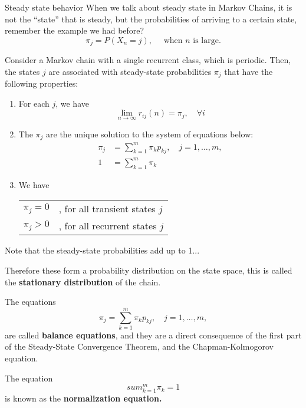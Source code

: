 \documentclass[aspectratio=169]{beamer}
\begin{document}
\begin{frame}{Steady state behavior}
    When we talk about steady state in Markov Chains, it is not the ``state'' that is steady,
    but the probabilities of arriving to a certain state, remember the example we had before?
    \[\pi_j=P(X_n=j),\quad \text{ when } n \text{ is large.}\]
\end{frame}

\begin{frame}
    \begin{theorem}
        Consider a Markov chain with a single recurrent class, which is periodic. Then, the states
        $j$ are associated with steady-state probabilities $\pi_j$ that have the following properties:
        \begin{enumerate}
            \item For each $j$, we have \[\lim_{n\rightarrow\infty}r_{ij}(n)=\pi_j,\quad\forall i\]
            \item The $\pi_j$ are the unique solution to the system of equations below:
                  \begin{align*}
                    \pi_j&=\sum_{k=1}^m\pi_{k}p_{kj},\quad j=1,\hdots,m,\\
                    1&= \sum_{k=1}^m \pi_k
                  \end{align*}
            \item We have
                  \begin{center}
                    \begin{tabular}{cl}
                        $\pi_j=0$&, for all transient states $j$\\
                        $\pi_j>0$&, for all recurrent states $j$
                    \end{tabular}
                  \end{center}
        \end{enumerate}
    \end{theorem}
\end{frame}

\begin{frame}
    Note that the steady-state probabilities add up to 1...\pause

    Therefore these form a probability distribution on the state space, this is called the
    \textbf{stationary distribution} of the chain.
\end{frame}

\begin{frame}
    \begin{definition}
        The equations \[\pi_j=\sum_{k=1}^m \pi_k p_{kj},\quad j=1,\hdots,m,\]
        are called \textbf{balance equations}, and they are a direct consequence of the first part
        of the Steady-State Convergence Theorem, and the Chapman-Kolmogorov equation.
    \end{definition}
    \begin{definition}
        The equation \[sum_{k=1}^m \pi_k=1\] is known as the \textbf{normalization equation.}
    \end{definition}
\end{frame}
\end{document}
